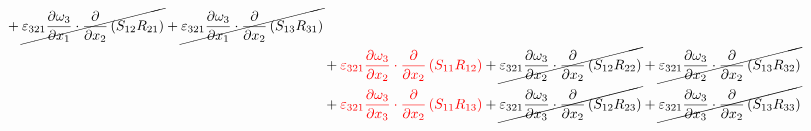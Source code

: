 \begin{equation}
\begin{split}
{}		+\cancel{\varepsilon_{321}\pdv{\omega_{3}}{x_{1}}\cdot\pdv{}{x_{2}}\left(S_{12}R_{21}\right)
}		+\cancel{\varepsilon_{321}\pdv{\omega_{3}}{x_{1}}\cdot\pdv{}{x_{2}}\left(S_{13}R_{31}\right)
}\\ 
		&+{\color{red}\varepsilon_{321}\pdv{\omega_{3}}{x_{2}}\cdot\pdv{}{x_{2}}\left(S_{11}R_{12}\right)
}		+\cancel{\varepsilon_{321}\pdv{\omega_{3}}{x_{2}}\cdot\pdv{}{x_{2}}\left(S_{12}R_{22}\right)
}		+\cancel{\varepsilon_{321}\pdv{\omega_{3}}{x_{2}}\cdot\pdv{}{x_{2}}\left(S_{13}R_{32}\right)
}\\ 
		&+{\color{red}\varepsilon_{321}\pdv{\omega_{3}}{x_{3}}\cdot\pdv{}{x_{2}}\left(S_{11}R_{13}\right)
}		+\cancel{\varepsilon_{321}\pdv{\omega_{3}}{x_{3}}\cdot\pdv{}{x_{2}}\left(S_{12}R_{23}\right)
}		+\cancel{\varepsilon_{321}\pdv{\omega_{3}}{x_{3}}\cdot\pdv{}{x_{2}}\left(S_{13}R_{33}\right)
}\\ 
	\end{split}
\end{equation}
